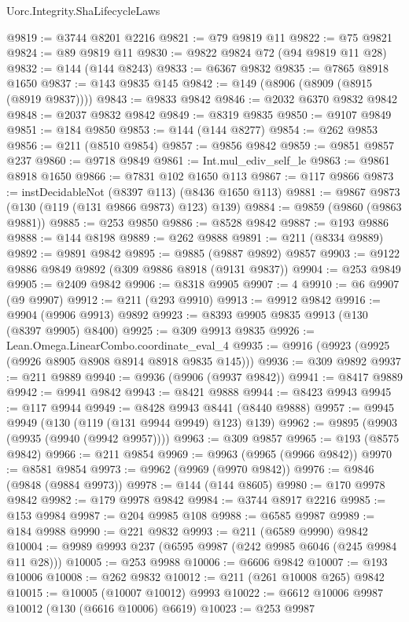 \begin{lexlean}{Uorc.Integrity.ShaLifecycleLaws}
\begin{coremodule}
@9819 := @3744 @8201 @2216
@9821 := @79 @9819 @11
@9822 := @75 @9821
@9824 := @89 @9819 @11
@9830 := @9822 @9824 @72 (@94 @9819 @11 @28)
@9832 := @144 (@144 @8243)
@9833 := @6367 @9832
@9835 := @7865 @8918 @1650
@9837 := @143 @9835 @145
@9842 := @149 (@8906 (@8909 (@8915 (@8919 @9837))))
@9843 := @9833 @9842
@9846 := @2032 @6370 @9832 @9842
@9848 := @2037 @9832 @9842
@9849 := @8319 @9835
@9850 := @9107 @9849
@9851 := @184 @9850
@9853 := @144 (@144 @8277)
@9854 := @262 @9853
@9856 := @211 (@8510 @9854)
@9857 := @9856 @9842
@9859 := @9851 @9857 @237
@9860 := @9718 @9849
@9861 := Int.mul_ediv_self_le
@9863 := @9861 @8918 @1650
@9866 := @7831 @102 @1650 @113
@9867 := @117 @9866
@9873 := instDecidableNot (@8397 @113) (@8436 @1650 @113)
@9881 := @9867 @9873 (@130 (@119 (@131 @9866 @9873) @123) @139)
@9884 := @9859 (@9860 (@9863 @9881))
@9885 := @253 @9850
@9886 := @8528 @9842
@9887 := @193 @9886
@9888 := @144 @8198
@9889 := @262 @9888
@9891 := @211 (@8334 @9889)
@9892 := @9891 @9842
@9895 := @9885 (@9887 @9892) @9857
@9903 := @9122 @9886 @9849 @9892 (@309 @9886 @8918 (@9131 @9837))
@9904 := @253 @9849
@9905 := @2409 @9842
@9906 := @8318 @9905
@9907 := 4
@9910 := @6 @9907 (@9 @9907)
@9912 := @211 (@293 @9910)
@9913 := @9912 @9842
@9916 := @9904 (@9906 @9913) @9892
@9923 := @8393 @9905 @9835 @9913 (@130 (@8397 @9905) @8400)
@9925 := @309 @9913 @9835
@9926 := Lean.Omega.LinearCombo.coordinate_eval_4
@9935 := @9916 (@9923 (@9925 (@9926 @8905 @8908 @8914 @8918 @9835 @145)))
@9936 := @309 @9892
@9937 := @211 @9889
@9940 := @9936 (@9906 (@9937 @9842))
@9941 := @8417 @9889
@9942 := @9941 @9842
@9943 := @8421 @9888
@9944 := @8423 @9943
@9945 := @117 @9944
@9949 := @8428 @9943 @8441 (@8440 @9888)
@9957 := @9945 @9949 (@130 (@119 (@131 @9944 @9949) @123) @139)
@9962 := @9895 (@9903 (@9935 (@9940 (@9942 @9957))))
@9963 := @309 @9857
@9965 := @193 (@8575 @9842)
@9966 := @211 @9854
@9969 := @9963 (@9965 (@9966 @9842))
@9970 := @8581 @9854
@9973 := @9962 (@9969 (@9970 @9842))
@9976 := @9846 (@9848 (@9884 @9973))
@9978 := @144 (@144 @8605)
@9980 := @170 @9978 @9842
@9982 := @179 @9978 @9842
@9984 := @3744 @8917 @2216
@9985 := @153 @9984
@9987 := @204 @9985 @108
@9988 := @6585 @9987
@9989 := @184 @9988
@9990 := @221 @9832
@9993 := @211 (@6589 @9990) @9842
@10004 := @9989 @9993 @237 (@6595 @9987 (@242 @9985 @6046 (@245 @9984 @11 @28)))
@10005 := @253 @9988
@10006 := @6606 @9842
@10007 := @193 @10006
@10008 := @262 @9832
@10012 := @211 (@261 @10008 @265) @9842
@10015 := @10005 (@10007 @10012) @9993
@10022 := @6612 @10006 @9987 @10012 (@130 (@6616 @10006) @6619)
@10023 := @253 @9987

\end{coremodule}
\end{lexlean}
